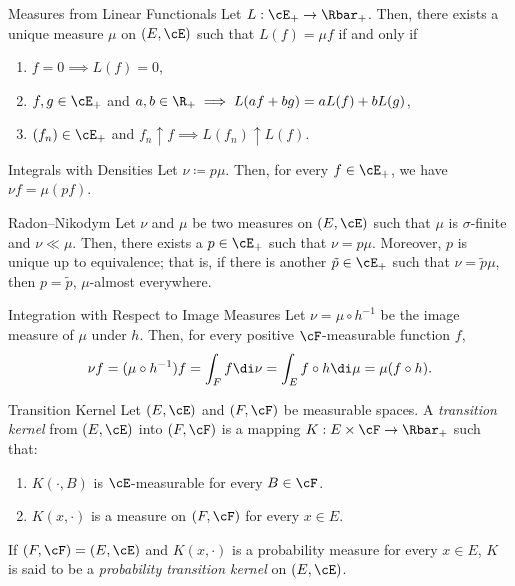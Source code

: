\begin{thm}{Measures from Linear Functionals}{}
	Let $L : \cE_+ \to \Rbar_+$. Then, there exists a unique measure $\mu$ on $(E, \cE)$ such that $L(f) = \mu f$ if and only if
	\begin{enumerate}
		\item $f = 0 \implies L(f) = 0$,
		\item $f, g \in \cE_+$ and $a, b \in \R_+ \implies L(af + bg) = aL(f) + bL(g)$,
		\item $(f_n) \in \cE_+$ and $f_n \uparrow f \implies L(f_n) \uparrow L(f)$.
	\end{enumerate}
\end{thm}

\begin{thm}{Integrals with Densities}{}
	Let $\nu \coloneqq p \mu$. Then, for every $f \in \cE_+$, we have $\nu f = \mu(pf)$.
\end{thm}

\begin{thm}{Radon--Nikodym}{}
	Let $\nu$ and $\mu$ be two measures on $(E, \cE)$ such that $\mu$ is $\sigma$-finite and $\nu \ll \mu$. Then, there exists a $p \in \cE_+$ such that $\nu = p \mu$. Moreover, $p$ is unique up to equivalence; that is, if there is another $\tilde{p} \in \cE_+$ such that $\nu = \tilde{p} \mu$, then $p = \tilde{p}$, $\mu$-almost everywhere.
\end{thm}

\begin{thm}{Integration with Respect to Image Measures}{}
	Let $\nu = \mu \circ h^{-1}$ be the image measure of $\mu$ under $h$. Then, for every positive $\cF$-measurable function $f$,
	\begin{equation*}
		\nu f = (\mu \circ h^{-1}) f = \int_F f \di \nu = \int_E f \circ h \di \mu = \mu(f \circ h).
	\end{equation*}
\end{thm}

\begin{defn}{Transition Kernel}{}
	Let $(E, \cE)$ and $(F, \cF)$ be measurable spaces. A \textit{transition kernel} from $(E, \cE)$ into $(F, \cF)$ is a mapping $K : E \times \cF \to \Rbar_+$ such that:
	\begin{enumerate}
		\item $K(\cdot, B)$ is $\cE$-measurable for every $B \in \cF$.
		\item $K(x, \cdot)$ is a measure on $(F, \cF)$ for every $x \in E$.
	\end{enumerate}
	If $(F, \cF) = (E, \cE)$ and $K(x, \cdot)$ is a probability measure for every $x \in E$, $K$ is said to be a \textit{probability transition kernel} on $(E, \cE)$.
\end{defn}

